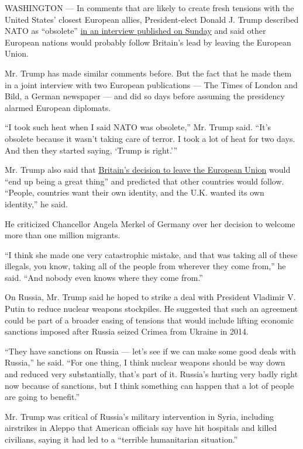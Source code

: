 WASHINGTON --- In comments that are likely to create fresh tensions with
the United States' closest European allies, President-elect Donald J.
Trump described NATO as ``obsolete''
\href{http://www.thetimes.co.uk/edition/news/i-ll-do-a-deal-with-britain-6hl2hl73l}{in
an interview published on Sunday} and said other European nations would
probably follow Britain's lead by leaving the European Union.

Mr. Trump has made similar comments before. But the fact that he made
them in a joint interview with two European publications --- The Times
of London and Bild, a German newspaper --- and did so days before
assuming the presidency alarmed European diplomats.

``I took such heat when I said NATO was obsolete,'' Mr. Trump said.
``It's obsolete because it wasn't taking care of terror. I took a lot of
heat for two days. And then they started saying, `Trump is right.'''

Mr. Trump also said that
\href{http://www.thetimes.co.uk/edition/news/brexit-will-be-a-great-thing-you-were-so-smart-to-get-out-09gp9z357}{Britain's
decision to leave the European Union} would ``end up being a great
thing'' and predicted that other countries would follow. ``People,
countries want their own identity, and the U.K. wanted its own
identity,'' he said.

He criticized Chancellor Angela Merkel of Germany over her decision to
welcome more than one million migrants.

``I think she made one very catastrophic mistake, and that was taking
all of these illegals, you know, taking all of the people from wherever
they come from,'' he said. ``And nobody even knows where they come
from.''

On Russia, Mr. Trump said he hoped to strike a deal with President
Vladimir V. Putin to reduce nuclear weapons stockpiles. He suggested
that such an agreement could be part of a broader easing of tensions
that would include lifting economic sanctions imposed after Russia
seized Crimea from Ukraine in 2014.

``They have sanctions on Russia --- let's see if we can make some good
deals with Russia,'' he said. ``For one thing, I think nuclear weapons
should be way down and reduced very substantially, that's part of it.
Russia's hurting very badly right now because of sanctions, but I think
something can happen that a lot of people are going to benefit.''

Mr. Trump was critical of Russia's military intervention in Syria,
including airstrikes in Aleppo that American officials say have hit
hospitals and killed civilians, saying it had led to a ``terrible
humanitarian situation.''

